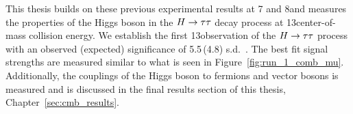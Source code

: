 This thesis builds on these previous experimental results at 7 and 8\TeV and measures the
properties of the Higgs boson in the $H\to\tau\tau$ decay process at 13\TeV center-of-mass 
collision energy. We establish the first 13\TeV observation of the $H\to\tau\tau$
process with an observed (expected) significance of 5.5\,(4.8) s.d.~\cite{HIG-18-007}. 
The best fit signal strengths are measured similar
to what is seen in Figure~\ref{fig:run_1_comb_mu}. Additionally, the couplings of the
Higgs boson to fermions and vector bosons is measured and is discussed in the final results
section of this thesis, Chapter~\ref{sec:cmb_results}.



